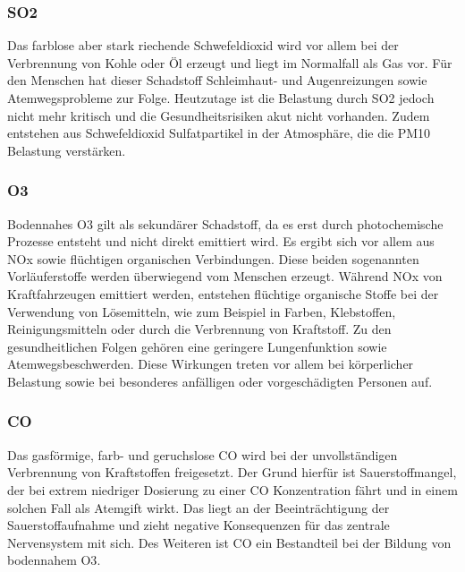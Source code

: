 \subsubsection{\acs{SO2}}
Das farblose aber stark riechende Schwefeldioxid wird vor allem bei der Verbrennung von Kohle oder Öl erzeugt und liegt im Normalfall als Gas vor. 
\newline
Für den Menschen hat dieser Schadstoff Schleimhaut- und Augenreizungen sowie Atemwegsprobleme zur Folge. 
\newline
Heutzutage ist die Belastung durch SO2 jedoch nicht mehr kritisch und die Gesundheitsrisiken akut nicht vorhanden.
\newline
Zudem entstehen aus Schwefeldioxid Sulfatpartikel in der Atmosphäre, die die PM10 Belastung verstärken. \cite{UBA.Luft}

\subsubsection{\acs{O3}}
Bodennahes \acs{O3} gilt als sekundärer Schadstoff, da es erst durch photochemische Prozesse entsteht und nicht direkt emittiert wird. Es ergibt sich vor allem aus \acs{NOx} sowie flüchtigen organischen Verbindungen. Diese beiden sogenannten Vorläuferstoffe werden überwiegend vom Menschen erzeugt. Während \acs{NOx} von Kraftfahrzeugen emittiert werden, entstehen flüchtige organische Stoffe bei der Verwendung von Lösemitteln, wie zum Beispiel in Farben, Klebstoffen, Reinigungsmitteln oder durch die Verbrennung von Kraftstoff. 
\newline
Zu den gesundheitlichen Folgen gehören eine geringere Lungenfunktion sowie Atemwegsbeschwerden. Diese Wirkungen treten vor allem bei körperlicher Belastung sowie bei besonderes anfälligen oder vorgeschädigten Personen auf. \cite{UBA.Luft}

\subsubsection{\acs{CO}}
Das gasförmige, farb- und geruchslose \acs{CO} wird bei der unvollständigen Verbrennung von Kraftstoffen freigesetzt. Der Grund hierfür ist Sauerstoffmangel, der bei extrem niedriger Dosierung zu einer \acs{CO} Konzentration fährt und in einem solchen Fall als Atemgift wirkt. Das liegt an der Beeinträchtigung der Sauerstoffaufnahme und zieht negative Konsequenzen für das zentrale Nervensystem mit sich. 
\newline
Des Weiteren ist \acs{CO} ein Bestandteil bei der Bildung von bodennahem \acs{O3}. \cite{UBA.Luft}

